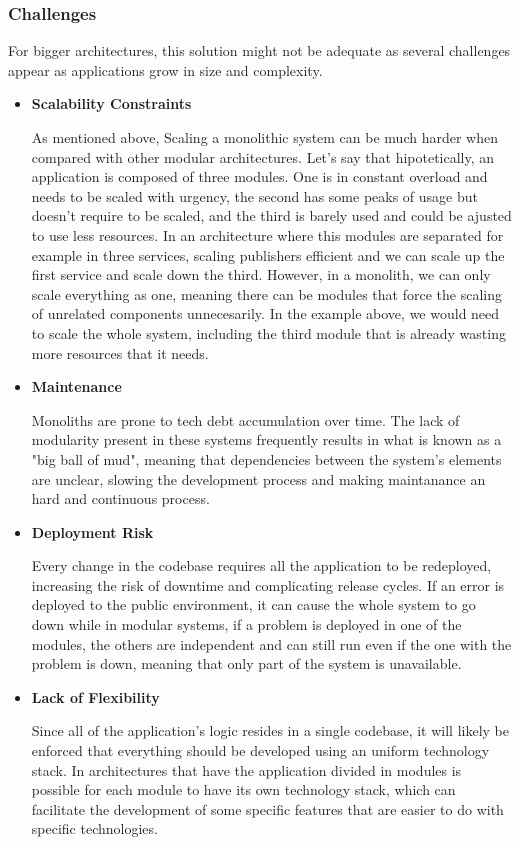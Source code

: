 \subsubsection{Challenges}
For bigger architectures, this solution might not be adequate as several
challenges appear as applications grow in size and complexity.
\begin{itemize}
	\item \textbf{Scalability Constraints}

	      As mentioned above, Scaling a monolithic system can be much harder when
	      compared with other modular architectures. Let's say that hipotetically,
	      an application is composed of three modules. One is in constant
	      overload and needs to be scaled with urgency, the second has some peaks of
	      usage but doesn't require to be scaled, and the third is barely used and
	      could be ajusted to use less resources. In an architecture where this
	      modules are separated for example in three services, scaling publishers
	      efficient and we can scale up the first service and scale down the third.
	      However, in a monolith, we can only scale everything as one, meaning there
	      can be modules that force the scaling of unrelated components unnecesarily.
	      In the example above, we would need to scale the whole system, including
	      the third module that is already wasting more resources that it needs.
	\item \textbf{Maintenance}

	      Monoliths are prone to tech debt accumulation over time. The lack
	      of modularity present in these systems frequently results in what is known as a
	      "big ball of mud", meaning that dependencies between the system's elements are
	      unclear, slowing the development process and making maintanance an
	      hard and continuous process\cite{7333476}.

	\item \textbf{Deployment Risk}

	      Every change in the codebase requires all the application to be redeployed,
	      increasing the risk of downtime and complicating release cycles. If an error
	      is deployed to the public environment, it can cause the whole system to go
	      down while in modular systems, if a problem is deployed in one of the
	      modules, the others are independent and can still run even if the one with
	      the problem is down, meaning that only part of the system is unavailable.

	\item \textbf{Lack of Flexibility}

	      Since all of the application's logic resides in a single codebase, it will
	      likely be enforced that everything should be developed using an uniform
	      technology stack. In architectures that have the application divided in
	      modules is possible for each module to have its own technology stack,
	      which can facilitate the development of some specific features that are
	      easier to do with specific technologies.
\end{itemize}

